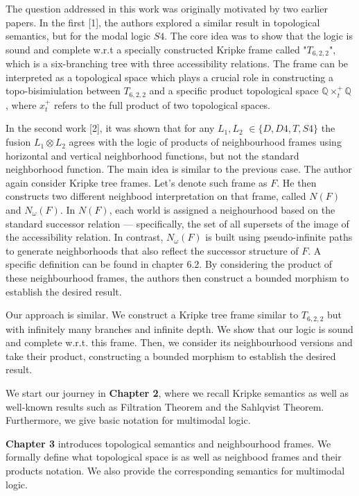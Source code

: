 \documentclass[12pt, a4paper]{scrartcl}
\begin{document}
The question addressed in this work was originally motivated by two earlier papers. In the first [1], the authors explored a similar result in topological semantics, but for the modal logic $S4$. 
The core idea was to show that the logic is sound and complete w.r.t a specially constructed Kripke frame called "$T_{6,2,2}$", which is a six-branching tree with three accessibility relations. 
The frame can be interpreted as a topological space which plays a crucial role in constructing a topo-bisimiulation between $T_{6,2,2}$ and a specific product topological space $\mathbb{Q} \times^+_t \mathbb{Q}$ , where $x^+_t$ refers to the full product of two topological spaces.

In the second work [2], it was shown that for any $L_1, L_2$ $\in \{D,D4,T,S4\}$ the fusion $L_1 \otimes L_2$
agrees with the logic of products of neighbourhood frames using horizontal and vertical neighborhood functions, but not the standard neighborhood function.
The main idea is similar to the previous case. The author again consider Kripke tree frames. Let's denote such frame as $F$. He then constructs two different neighbood interpretation on that frame, called $N(F)$ and $N_\omega(F)$.
In $N(F)$, each world is assigned a neighourhood based on the standard successor relation — specifically, the set of all supersets of the image of the accessibility relation.
In contrast, $N_\omega(F)$ is built using pseudo-infinite paths to generate neighborhoods that also reflect the successor structure of $F$. A specific definition can be found in chapter 
6.2. By considering the product of these neighbourhood frames, the authors then construct a bounded morphism to establish the desired result. 

Our approach is similar. We construct a Kripke tree frame similar to $T_{6,2,2}$ but with infinitely many branches and infinite depth. We show that our logic is sound and complete w.r.t. this frame.
Then, we consider its neighbourhood versions and take their product, constructing a bounded morphism to establish the desired result. \newline

We start our journey in \textbf{Chapter 2}, where we recall Kripke semantics as well as well-known results such as Filtration Theorem and the Sahlqvist Theorem.
Furthermore, we give basic notation for multimodal logic. \newline

\textbf{Chapter 3   } introduces topological semantics and neighbourhood frames. We formally define what topological space is as well as neighbood frames and their products notation.
We also provide the corresponding semantics for multimodal logic. \newline
\end{document}
